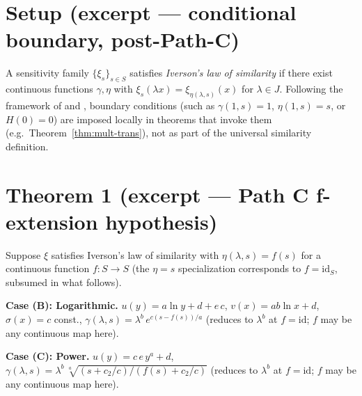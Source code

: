 
\section{Setup (excerpt — conditional boundary, post-Path-C)}
\label{sec:setup}

A sensitivity family $\{\xi_s\}_{s \in S}$ satisfies \emph{Iverson's law of
similarity} if there exist continuous functions $\gamma, \eta$ with
$\xi_s(\lambda x) = \xi_{\eta(\lambda,s)}(x)$ for $\lambda \in J$.
Following the framework of \citet{DobleHsu2020} and
\citet{GselmannDobleHsu2025}, boundary conditions (such as
$\gamma(1, s) = 1$, $\eta(1, s) = s$, or $H(0) = 0$) are imposed locally
in theorems that invoke them (e.g.\ Theorem~\ref{thm:mult-trans}), not as
part of the universal similarity definition.

\section{Theorem 1 (excerpt — Path C f-extension hypothesis)}
\label{sec:thm1}

\begin{theorem}[Gain-control with $\eta(\lambda,s)=f(s)$]
\label{thm:eta-s}
Suppose $\xi$ satisfies Iverson's law of similarity with
$\eta(\lambda, s) = f(s)$ for a continuous function $f\colon S \to S$
(the $\eta = s$ specialization corresponds to $f = \mathrm{id}_S$, subsumed
in what follows).
\end{theorem}

\textbf{Case (B): Logarithmic.}
$u(y) = a \ln y + d + e\,c$,
$v(x) = a b \ln x + d$, $\sigma(x) = c$ const.,
$\gamma(\lambda, s) = \lambda^b\, e^{c(s - f(s))/a}$
(reduces to $\lambda^b$ at $f = \mathrm{id}$; $f$ may be any continuous map here).

\textbf{Case (C): Power.}
$u(y) = c\,e\, y^a + d$,
$\gamma(\lambda, s) = \lambda^b\, \sqrt[a]{(s + c_2/c)/(f(s) + c_2/c)}$
(reduces to $\lambda^b$ at $f = \mathrm{id}$; $f$ may be any continuous map here).

